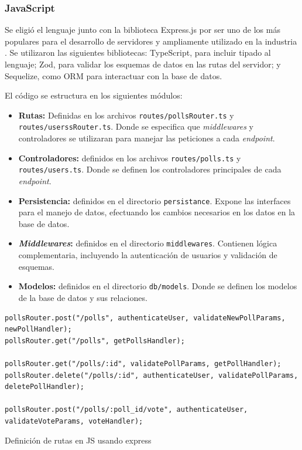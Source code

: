 \documentclass[11pt]{article}
\let\Oldsubsubsection\subsubsection
\renewcommand{\subsubsection}{\FloatBarrier\Oldsubsubsection}
\newcommand{\english}[1]{\textit{#1}}
\begin{document}
\subsubsection{JavaScript}

Se eligió el lenguaje junto con la biblioteca Express.js por ser uno de los más populares para el desarrollo de servidores y ampliamente utilizado en la industria \cite{http:web_frameworks_survey}. Se utilizaron las siguientes bibliotecas: TypeScript, para incluir tipado al lenguaje; Zod, para validar los esquemas de datos en las rutas del servidor; y Sequelize, como ORM para interactuar con la base de datos.

El código se estructura en los siguientes módulos:

\begin{itemize}
    \item \textbf{Rutas:} Definidas en los archivos \lstinline{routes/pollsRouter.ts} y \lstinline{routes/userssRouter.ts}. Donde se especifica que \english{middlewares} y controladores se utilizaran para manejar las peticiones a cada \english{endpoint}.
    
    \item \textbf{Controladores:} definidos en los archivos \lstinline{routes/polls.ts} y \lstinline{routes/users.ts}. Donde se definen los controladores principales de cada \english{endpoint}.

    \item \textbf{Persistencia:} definidos en el directorio \lstinline{persistance}. Expone las interfaces para el manejo de datos, efectuando los cambios necesarios en los datos en la base de datos.
    
    \item \textbf{\english{Middlewares}:} definidos en el directorio \lstinline{middlewares}. Contienen lógica complementaria, incluyendo la autenticación de usuarios y validación de esquemas.
    
    \item \textbf{Modelos:} definidos en el directorio \lstinline{db/models}. Donde se definen los modelos de la base de datos y sus relaciones.
\end{itemize}


\begin{listing}[h]
\begin{verbatim}
pollsRouter.post("/polls", authenticateUser, validateNewPollParams, newPollHandler);
pollsRouter.get("/polls", getPollsHandler);

pollsRouter.get("/polls/:id", validatePollParams, getPollHandler);
pollsRouter.delete("/polls/:id", authenticateUser, validatePollParams, deletePollHandler);

pollsRouter.post("/polls/:poll_id/vote", authenticateUser, validateVoteParams, voteHandler);
\end{verbatim}
\caption{Definición de rutas en JS usando express}
\label{code:http_js_routes}
\end{listing}
\end{document}
